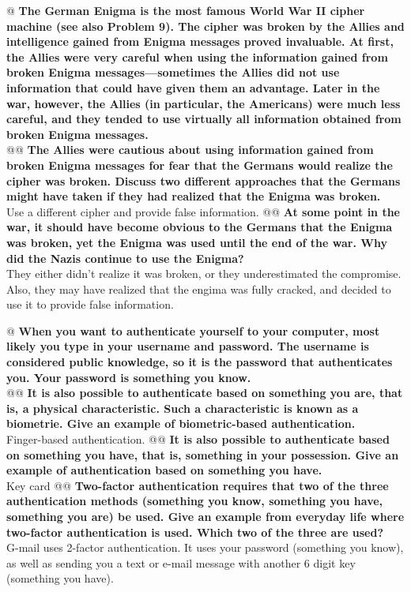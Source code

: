 \documentclass{article}
\begin{document}
\begin{easylist}
 	@ \textbf{The German Enigma is the most famous World War II cipher machine (see also Problem 9). The cipher was broken by the Allies and intelligence gained from Enigma messages proved invaluable. At first, the Allies were very careful when using the information gained from broken Enigma messages—sometimes the Allies did not use information that could have given them an advantage. Later in the war, however, the Allies (in particular, the Americans) were much less careful, and they tended to use virtually all information obtained from broken Enigma messages.}\\
 	@@ \textbf{The Allies were cautious about using information gained from broken Enigma messages for fear that the Germans would realize the cipher was broken. Discuss two different approaches that the Germans might have taken if they had realized that the Enigma was broken.}\\
 		Use a different cipher and provide false information.
 	@@ \textbf{At some point in the war, it should have become obvious to the Germans that the Enigma was broken, yet the Enigma was used until the end of the war. Why did the Nazis continue to use the Enigma?}\\
 		They either didn't realize it was broken, or they underestimated the compromise. Also, they may have realized that the engima was fully cracked, and decided to use it to provide false information.
 	
 	@ \textbf{When you want to authenticate yourself to your computer, most likely you type in your username and password. The username is considered public knowledge, so it is the password that authenticates you. Your password is something you know.}\\
 	@@ \textbf{It is also possible to authenticate based on something you are, that is, a physical characteristic. Such a characteristic is known as a biometrie. Give an example of biometric-based authentication.}\\
 		Finger-based authentication.
 	@@ \textbf{It is also possible to authenticate based on something you have, that is, something in your possession. Give an example of authentication based on something you have.}\\
 		Key card
 	@@ \textbf{Two-factor authentication requires that two of the three authentication methods (something you know, something you have, something you are) be used. Give an example from everyday life where two-factor authentication is used. Which two of the three are used?}\\
 		G-mail uses 2-factor authentication. It uses your password (something you know), as well as sending you a text or e-mail message with another 6 digit key (something you have).
 	

\end{easylist}
\end{document}
